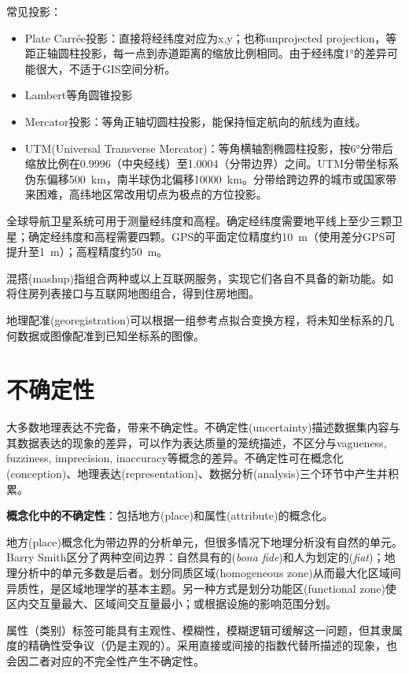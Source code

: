 \par 常见投影：
\begin{itemize}
    \item Plate Carr\'{e}e投影：直接将经纬度对应为x,y；也称unprojected projection，等距正轴圆柱投影，每一点到赤道距离的缩放比例相同。由于经纬度1°的差异可能很大，不适于GIS空间分析。
    \item Lambert等角圆锥投影
    \item Mercator投影：等角正轴切圆柱投影，能保持恒定航向的航线为直线。
    \item UTM(Universal Transverse Mercator)：等角横轴割椭圆柱投影，按6°分带后缩放比例在0.9996（中央经线）至1.0004（分带边界）之间。UTM分带坐标系伪东偏移\SI{500}{\kilo\metre}，南半球伪北偏移\SI{10000}{\kilo\metre}。分带给跨边界的城市或国家带来困难，高纬地区常改用切点为极点的方位投影。
\end{itemize}

\par 全球导航卫星系统可用于测量经纬度和高程。确定经纬度需要地平线上至少三颗卫星；确定经纬度和高程需要四颗。GPS的平面定位精度约\SI{10}{\metre}（使用差分GPS可提升至\SI{1}{\metre}）；高程精度约\SI{50}{\metre}。

\par 混搭(mashup)指组合两种或以上互联网服务，实现它们各自不具备的新功能。如将住房列表接口与互联网地图组合，得到住房地图。

\par 地理配准(georegistration)可以根据一组参考点拟合变换方程，将未知坐标系的几何数据或图像配准到已知坐标系的图像。

\section{不确定性}

\par 大多数地理表达不完备，带来不确定性。不确定性(uncertainty)描述数据集内容与其数据表达的现象的差异，可以作为表达质量的笼统描述，不区分与vagueness, fuzziness, imprecision, inaccuracy等概念的差异。不确定性可在概念化(conception)、地理表达(representation)、数据分析(analysis)三个环节中产生并积累。

\par \textbf{概念化中的不确定性}：包括地方(place)和属性(attribute)的概念化。
\par 地方(place)概念化为带边界的分析单元，但很多情况下地理分析没有自然的单元。Barry Smith区分了两种空间边界：自然具有的(\emph{bona fide})和人为划定的(\emph{fiat})；地理分析中的单元多数是后者。划分同质区域(homogeneous zone)从而最大化区域间异质性，是区域地理学的基本主题。另一种方式是划分功能区(functional zone)使区内交互量最大、区域间交互量最小；或根据设施的影响范围分划。
\par 属性（类别）标签可能具有主观性、模糊性，模糊逻辑可缓解这一问题，但其隶属度的精确性受争议（仍是主观的）。采用直接或间接的指数代替所描述的现象，也会因二者对应的不完全性产生不确定性。

